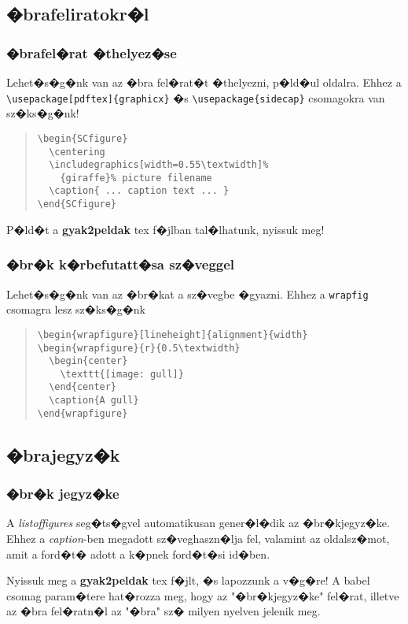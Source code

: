 \documentclass[xcolor=pdftex,dvipsnames,table,compress,bigger]{beamer}
\begin{document}
\subsection{�brafeliratokr�l}
\begin{frame}[fragile]
	\frametitle{�brafel�rat �thelyez�se}
Lehet�s�g�nk van az �bra fel�rat�t �thelyezni, p�ld�ul oldalra. Ehhez a \verb*|\usepackage[pdftex]{graphicx}| �s \verb*|\usepackage{sidecap}| csomagokra van sz�ks�g�nk!
	\begin{block}{}
			    \begin{quote}
			    {\footnotesize
    \begin{verbatim}
\begin{SCfigure}
  \centering
  \includegraphics[width=0.55\textwidth]%
    {giraffe}% picture filename
  \caption{ ... caption text ... }
\end{SCfigure}
    \end{verbatim}}
    \end{quote}
	\end{block}
P�ld�t a \textbf{gyak2peldak} tex f�jlban tal�lhatunk, nyissuk meg!

\end{frame}

\begin{frame}[fragile]
	\frametitle{�br�k k�rbefutatt�sa sz�veggel}
Lehet�s�g�nk van az �br�kat a sz�vegbe �gyazni. Ehhez a \verb*|wrapfig| csomagra lesz sz�ks�g�nk
	\begin{block}{}
			    \begin{quote}{\footnotesize
    \begin{verbatim}
\begin{wrapfigure}[lineheight]{alignment}{width}
\begin{wrapfigure}{r}{0.5\textwidth}
  \begin{center}
    \texttt{[image: gull]}
  \end{center}
  \caption{A gull}
\end{wrapfigure}
    \end{verbatim}}
    \end{quote}
	\end{block}
\end{frame}

\subsection{�brajegyz�k}
\begin{frame}
	\frametitle{�br�k jegyz�ke}

	\begin{block}{}
		A \textit{listoffigures} seg�ts�gvel automatikusan gener�l�dik az �br�kjegyz�ke. Ehhez a \textit{caption}-ben megadott sz�veghaszn�lja fel, valamint az oldalsz�mot, amit a ford�t� adott a k�pnek ford�t�si id�ben.
	\end{block}
Nyissuk meg a \textbf{gyak2peldak} tex f�jlt, �s lapozzunk a v�g�re! A babel csomag param�tere hat�rozza meg, hogy az "�br�kjegyz�ke" fel�rat, illetve az �bra fel�ratn�l az "�bra" sz� milyen nyelven jelenik meg. 
\end{frame}


\end{document}
